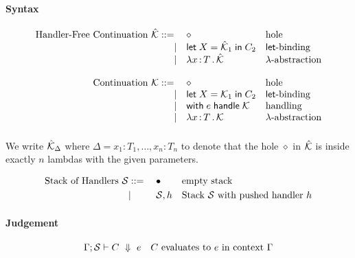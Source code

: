 \documentclass{article}
\newcommand{\G}{\Gamma}
\newcommand{\D}{\Delta}
\newcommand{\bnf}{\mathrel{{:}{:}{=}}}
\newcommand{\bnfor}{|}
\newcommand{\x}{x}     %
\newcommand{\C}{C}     %
\newcommand{\X}{X}     %
\newcommand{\e}{e}     %
\newcommand{\rgn}{r}   %
\newcommand{\h}{h}     %
\newcommand{\T}{T}     %
\newcommand{\KK}{{\cal K}} %
\newcommand{\letin}[1]{\mathsf{let}\; #1 \;\mathsf{in}\;} %
\newcommand{\withhandle}[1]{\mathsf{with}\;#1\;\mathsf{handle}\;} %
\newcommand{\abs}[1]{\mathsf{abs}\;#1\;\mathsf{in}\;} %
\newcommand{\lam}[2]{\lambda #1 \,{:}\, #2 \,.\,} %
\newcommand{\hfcont}{\hat{\cal K}}     %
\newcommand{\hole}{\diamond}
\newcommand{\evalto}[3][\G]{#1 \vdash #2 \ \Downarrow\  #3}
\renewcommand{\S}{{\cal S}}
\newcommand{\GS}{\Gamma; \S}
\newcommand{\emptystack}{\bullet}
\begin{document}
\paragraph{Syntax}

\begin{equation*}
  \begin{array}{rll}
  \text{Handler-Free Continuation $\hfcont$}  \bnf   {} & \hole                & \text{hole} \\
    \bnfor {} & \letin{\X = \hfcont_1} \C_2  & \text{$\mathsf{let}$-binding} \\
    \bnfor {} & \lam{\x}{\T} \hfcont   & \text{$\lambda$-abstraction} \\
    \\
  \text{Continuation $\KK$}  \bnf   {} & \hole                & \text{hole} \\
    \bnfor {} & \letin{\X = \KK_1} \C_2  & \text{$\mathsf{let}$-binding} \\
    \bnfor {} & \withhandle{\e} \KK & \text{handling} \\
    \bnfor {} & \lam{\x}{\T} \KK   & \text{$\lambda$-abstraction} \\[10pt]
  \end{array}
\end{equation*}
%
We write $\hfcont_\D$ where $\D = {\x_1{:}\T_1,\ldots,x_n{:}T_n}$ to denote that the hole $\hole$ in $\hfcont$ is inside
exactly $n$ lambdas with the given parameters.

\begin{equation*}
  \text{Stack of Handlers $\S$}
  \begin{aligned}[t]
    &\bnf   {} && \emptystack                && \text{empty stack} \\
    &\bnfor {} && \S,\h                      && \text{Stack $\S$ with pushed handler $\h$} \\
  \end{aligned}
\end{equation*}
%


\paragraph{Judgement}

\begin{align*}
  &\evalto[\GS]{C}{\e} &&\text{$C$ evaluates to $e$ in context $\G$} \\
\end{align*}
%
\end{document}
